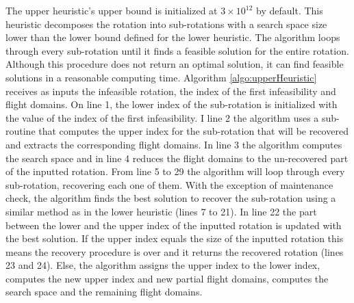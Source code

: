 The upper heuristic's upper bound is initialized at $3 \times 10^{12}$ by default. This heuristic  decomposes the rotation into sub-rotations with a search space size lower than the lower bound defined for the lower heuristic. The algorithm loops through every sub-rotation until it finds a feasible solution for the entire rotation. Although this procedure does not return an optimal solution, it can find feasible solutions in a reasonable computing time. Algorithm \ref{algo:upperHeuristic} receives as inputs the infeasible rotation, the index of the first infeasibility and flight domains. On line 1, the lower index of the sub-rotation is initialized with the value of the index of the first infeasibility. I line 2 the algorithm uses a sub-routine that computes the upper index for the sub-rotation that will be recovered and extracts the corresponding flight domains. In line 3 the algorithm computes the search space and  in line 4 reduces the flight domains to the un-recovered part of the inputted rotation. From line 5 to 29 the algorithm will loop through every sub-rotation, recovering each one of them. With the exception of maintenance check, the algorithm finds the best solution to recover the sub-rotation using a similar method as in the lower heuristic (lines 7 to 21). In line 22 the part between the lower and the upper index of the inputted rotation is updated with the best solution. If the upper index equals the size of the inputted rotation this means the recovery procedure is over and it returns the recovered rotation (lines 23 and 24). Else, the algorithm assigns the upper index to the lower index, computes the new upper index and new partial flight domains, computes the search space and the remaining flight domains.


